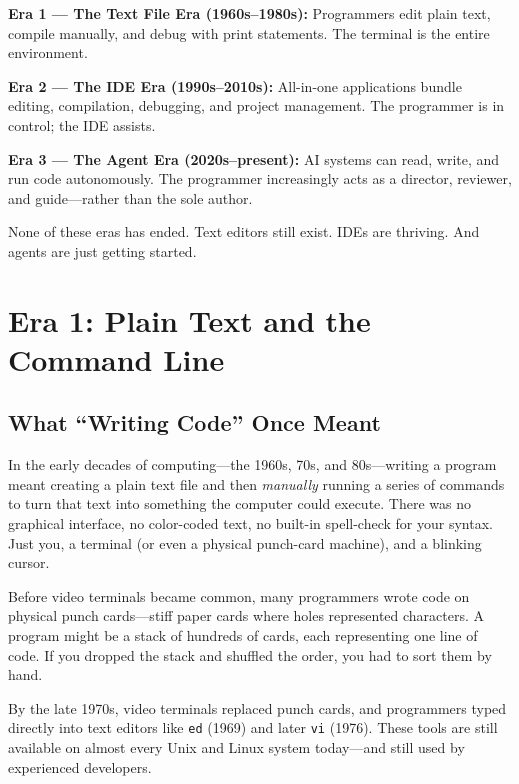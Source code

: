 \documentclass[11pt,letterpaper]{article}
\begin{document}
\begin{conceptbox}
\textbf{Era 1 --- The Text File Era (1960s--1980s):} Programmers edit plain text, compile manually, and debug with print statements. The terminal is the entire environment.

\textbf{Era 2 --- The IDE Era (1990s--2010s):} All-in-one applications bundle editing, compilation, debugging, and project management. The programmer is in control; the IDE assists.

\textbf{Era 3 --- The Agent Era (2020s--present):} AI systems can read, write, and run code autonomously. The programmer increasingly acts as a director, reviewer, and guide---rather than the sole author.

None of these eras has ended. Text editors still exist. IDEs are thriving. And agents are just getting started.
\end{conceptbox}

\section{Era 1: Plain Text and the Command Line}

\subsection{What ``Writing Code'' Once Meant}

In the early decades of computing---the 1960s, 70s, and 80s---writing a program meant creating a plain text file and then \textit{manually} running a series of commands to turn that text into something the computer could execute. There was no graphical interface, no color-coded text, no built-in spell-check for your syntax. Just you, a terminal (or even a physical punch-card machine), and a blinking cursor.

\begin{historybox}
Before video terminals became common, many programmers wrote code on physical punch cards---stiff paper cards where holes represented characters. A program might be a stack of hundreds of cards, each representing one line of code. If you dropped the stack and shuffled the order, you had to sort them by hand.

By the late 1970s, video terminals replaced punch cards, and programmers typed directly into text editors like \texttt{ed} (1969) and later \texttt{vi} (1976). These tools are still available on almost every Unix and Linux system today---and still used by experienced developers.
\end{historybox}
\end{document}
